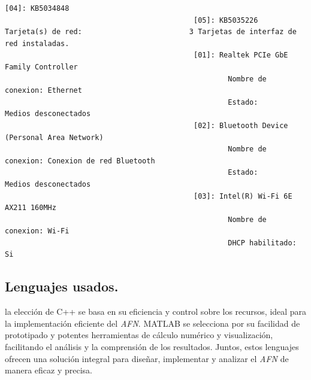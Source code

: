 \documentclass{article}
\begin{document}
\begin{lstlisting}[language={},basicstyle=\ttfamily\footnotesize]
                                            [04]: KB5034848
                                            [05]: KB5035226
Tarjeta(s) de red:                         3 Tarjetas de interfaz de red instaladas.
                                            [01]: Realtek PCIe GbE Family Controller
                                                    Nombre de conexion: Ethernet
                                                    Estado:             Medios desconectados
                                            [02]: Bluetooth Device (Personal Area Network)
                                                    Nombre de conexion: Conexion de red Bluetooth
                                                    Estado:             Medios desconectados
                                            [03]: Intel(R) Wi-Fi 6E AX211 160MHz
                                                    Nombre de conexion: Wi-Fi
                                                    DHCP habilitado:    Si

            \end{lstlisting}
    \subsection[Lenguajes]{Lenguajes usados.}
    la elección de C++ se basa en su eficiencia y control sobre los recursos, ideal para la implementación eficiente del \textit{AFN}.
    MATLAB se selecciona por su facilidad de prototipado y potentes herramientas de cálculo numérico y visualización,
    facilitando el análisis y la comprensión de los resultados. Juntos, estos lenguajes ofrecen una solución integral para diseñar,
    implementar y analizar el \textit{AFN} de manera eficaz y precisa.
\end{document}
